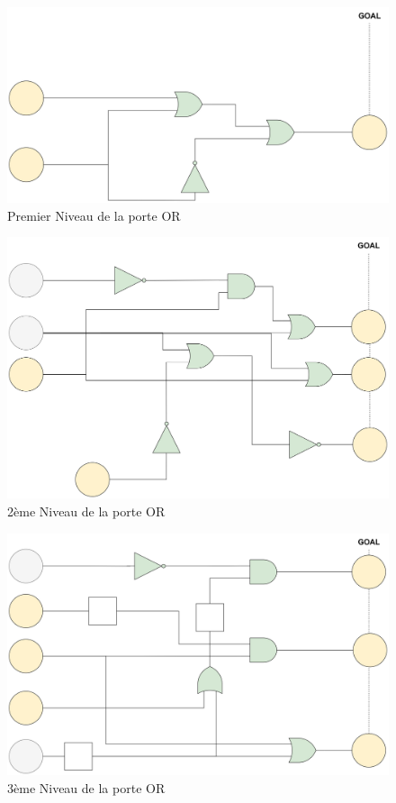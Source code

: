 \documentclass{article}
\begin{document}
\begin{figure}[h]
    \centering
    \includegraphics[width=\textwidth]{img/Levels-OR-1.jpg}
    \caption{Premier Niveau de la porte OR}
\end{figure}
\begin{figure}[h]
    \centering
    \includegraphics[width=\textwidth]{img/Levels-OR-2.jpg}
    \caption{2ème Niveau de la porte OR}
\end{figure}
\begin{figure}[h]
    \centering
    \includegraphics[width=\textwidth]{img/Levels-OR-3.jpg}
    \caption{3ème Niveau de la porte OR}
\end{figure}
\end{document}
